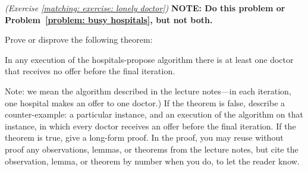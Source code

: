 \documentclass[11pt]{article}
\renewcommand{\inputAnswer}[1]{}
\begin{document}
\newpage
{\small
\problem\emph{(Exercise \ref{matching: exercise: lonely doctor})}\label{problem: lonely doctor}
\textbf{NOTE: Do this problem or Problem~\ref{problem: busy hospitals}, but not both.}

Prove or disprove the following theorem:

\begin{theorem}
  In any execution of the hospitals-propose  algorithm
  there is at least one doctor that receives no offer before the final iteration.
\end{theorem}

Note: we mean the algorithm described in the lecture notes---in each iteration, one hospital makes an offer to one doctor.)
If the theorem is false, describe a counter-example:
a particular instance, and an execution of the algorithm on that instance,
in which every doctor receives an offer before the final iteration.
If the theorem is true, give a long-form proof.
In the proof, you may reuse without proof any observations, lemmas, or theorems from the lecture notes,
but cite the observation, lemma, or theorem by number when you do, to let the reader know.
}


\inputAnswer{problem_6_answer}
\end{document}
